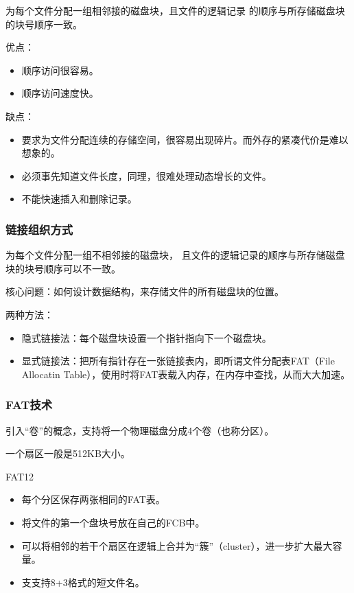 \documentclass[12pt, a4paper, oneside]{ctexart}
\begin{document}
为每个文件分配一组相邻接的磁盘块，且文件的逻辑记录
的顺序与所存储磁盘块的块号顺序一致。

优点：
\begin{itemize}
    \item 顺序访问很容易。
    \item 顺序访问速度快。
\end{itemize}

缺点：
\begin{itemize}
    \item 要求为文件分配连续的存储空间，很容易出现碎片。而外存的紧凑代价是难以想象的。
    \item 必须事先知道文件长度，同理，很难处理动态增长的文件。
    \item 不能快速插入和删除记录。
\end{itemize}

\subsubsection{链接组织方式}

为每个文件分配一组不相邻接的磁盘块，
且文件的逻辑记录的顺序与所存储磁盘块的块号顺序可以不一致。

核心问题：如何设计数据结构，来存储文件的所有磁盘块的位置。

两种方法：
\begin{itemize}
    \item 隐式链接法：每个磁盘块设置一个指针指向下一个磁盘块。
    \item 显式链接法：把所有指针存在一张链接表内，即所谓文件分配表FAT（File Allocatin Table），使用时将FAT表载入内存，在内存中查找，从而大大加速。
\end{itemize}

\subsubsection{FAT技术}

引入“卷”的概念，支持将一个物理磁盘分成4个卷（也称分区）。

一个扇区一般是512KB大小。

FAT12
\begin{itemize}
    \item 每个分区保存两张相同的FAT表。
    \item 将文件的第一个盘块号放在自己的FCB中。
    \item 可以将相邻的若干个扇区在逻辑上合并为“簇”（cluster），进一步扩大最大容量。
    \item 支支持8+3格式的短文件名。
\end{itemize}
\end{document}
